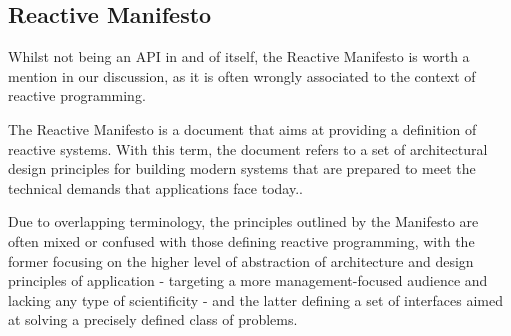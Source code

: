 \subsection{Reactive Manifesto}

Whilst not being an API in and of itself, the Reactive Manifesto is worth a mention in our discussion, as it is often wrongly associated to the context of reactive programming.

The Reactive Manifesto\cite{reactive-manifesto} is a document that aims at providing a definition of reactive systems. With this term, the document refers to a set of architectural design principles for building modern systems that are prepared to meet the technical demands that applications face today.\cite{manifesto-vs-programming}. 

Due to overlapping terminology, the principles outlined by the Manifesto are often mixed or confused with those defining reactive programming, with the former focusing on the higher level of abstraction of architecture and design principles of application - targeting a more management-focused audience and lacking any type of scientificity - and the latter defining a set of interfaces aimed at solving a precisely defined class of problems.

